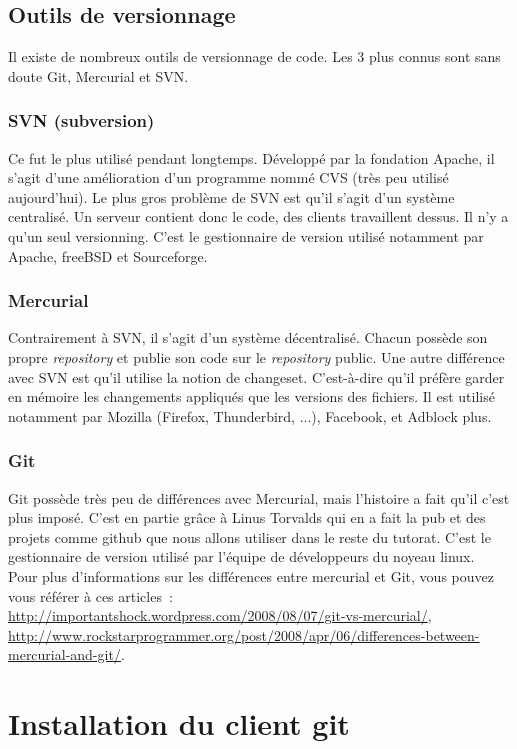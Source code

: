 \documentclass[a4paper,10pt]{report}
\begin{document}
    \subsection{Outils de versionnage}
Il existe de nombreux outils de versionnage de code. Les 3 plus connus sont sans doute Git, Mercurial et SVN.
      \subsubsection{SVN (subversion)}
Ce fut le plus utilis\'e pendant longtemps. D\'evelopp\'e par la fondation Apache, il s'agit d'une am\'elioration d'un programme nomm\'e CVS (tr\`es peu utilis\'e aujourd'hui). Le plus gros probl\`eme de SVN est qu'il s'agit d'un syst\`eme centralis\'e. Un serveur contient donc le code, des clients travaillent dessus. Il n'y a qu'un seul versionning. C'est le gestionnaire de version utilis\'e notamment par Apache, freeBSD et Sourceforge.
      \subsubsection{Mercurial}
Contrairement \`a SVN, il s'agit d'un syst\`eme d\'ecentralis\'e. Chacun poss\`ede son propre \emph{repository} et publie son code sur le \emph{repository} public. Une autre diff\'erence avec SVN est qu'il utilise la notion de changeset. C'est-\`a-dire qu'il pr\'ef\`ere garder en m\'emoire les changements appliqu\'es que les versions des fichiers. Il est utilis\'e notamment par Mozilla (Firefox, Thunderbird, ...), Facebook, et Adblock plus.
      \subsubsection{Git}
Git poss\`ede tr\`es peu de diff\'erences avec Mercurial, mais l'histoire a fait qu'il c'est plus impos\'e.
C'est en partie grâce \`a Linus Torvalds qui en a fait la pub et des projets comme github que nous allons utiliser dans le reste du tutorat.
C'est le gestionnaire de version utilis\'e par l'\'equipe de d\'eveloppeurs du noyeau linux.\\

Pour plus d'informations sur les diff\'erences entre mercurial et Git, vous pouvez vous r\'ef\'erer \`a ces articles~: \url{http://importantshock.wordpress.com/2008/08/07/git-vs-mercurial/}, \url{http://www.rockstarprogrammer.org/post/2008/apr/06/differences-between-mercurial-and-git/}.
  \section{Installation du client git}
\end{document}
